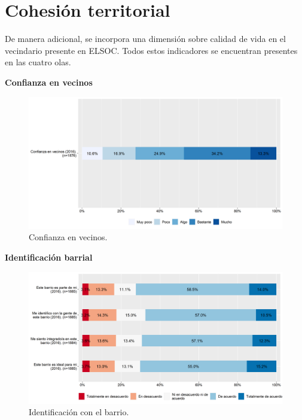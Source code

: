 \documentclass[
  12pt,
]{book}
\begin{document}
\hypertarget{cohesiuxf3n-territorial}{%
\section{Cohesión territorial}\label{cohesiuxf3n-territorial}}

De manera adicional, se incorpora una dimensión sobre calidad de vida en el vecindario presente en ELSOC. Todos estos indicadores se encuentran presentes en las cuatro olas.

\textbf{Confianza en vecinos}

\begin{figure}[H]

{\centering \includegraphics[width=1\linewidth,height=1\textheight]{output/graphs/confianza-vecinos} 

}

\caption{Confianza en vecinos.}\label{fig:unnamed-chunk-3}
\end{figure}

\textbf{Identificación barrial}

\begin{figure}[H]

{\centering \includegraphics[width=1\linewidth,height=1\textheight]{output/graphs/cohesion-barrial} 

}

\caption{ Identificación con el barrio.}\label{fig:unnamed-chunk-4}
\end{figure}
\end{document}
